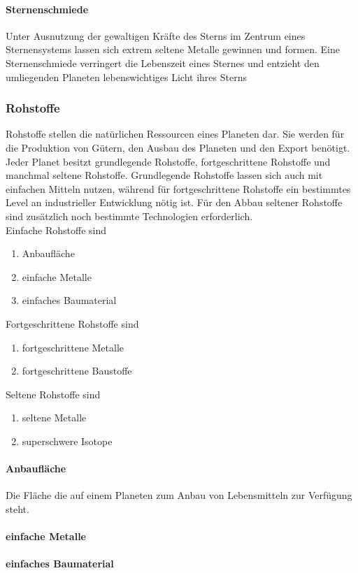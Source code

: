\documentclass[11pt, a4paper]{article}
\begin{document}
\paragraph{Sternenschmiede}
Unter Ausnutzung der gewaltigen Kräfte des Sterns im Zentrum eines Sternensystems lassen sich extrem seltene
Metalle gewinnen und formen. Eine Sternenschmiede verringert die Lebenszeit eines Sternes und entzieht den
umliegenden Planeten lebenswichtiges Licht ihres Sterns
%
\subsubsection{Rohstoffe}
Rohstoffe stellen die natürlichen Ressourcen eines Planeten dar. Sie werden für die Produktion von Gütern,
den Ausbau des Planeten und den Export benötigt. Jeder Planet besitzt grundlegende Rohstoffe, fortgeschrittene
Rohstoffe und manchmal seltene Rohstoffe. Grundlegende Rohstoffe lassen sich auch mit einfachen Mitteln
nutzen, während für fortgeschrittene Rohstoffe ein bestimmtes Level an industrieller Entwicklung nötig ist.
Für den Abbau seltener Rohstoffe sind zusätzlich noch bestimmte Technologien erforderlich.
\\
Einfache Rohstoffe sind
\begin{enumerate}
	\item Anbaufläche
	\item einfache Metalle
	\item einfaches Baumaterial
\end{enumerate}
%
Fortgeschrittene Rohstoffe sind
\begin{enumerate}
	\item fortgeschrittene Metalle
	\item fortgeschrittene Baustoffe
\end{enumerate}
%
Seltene Rohstoffe sind
\begin{enumerate}
	\item seltene Metalle
	\item superschwere Isotope
\end{enumerate}
%
\paragraph{Anbaufläche}
Die Fläche die auf einem Planeten zum Anbau von Lebensmitteln zur Verfügung steht.
%
\paragraph{einfache Metalle}
%
\paragraph{einfaches Baumaterial}
%
\end{document}
